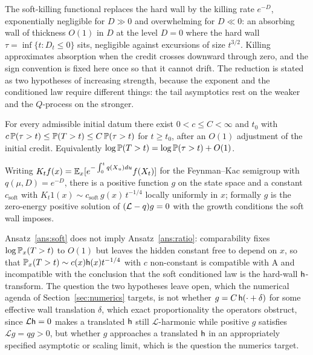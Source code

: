 The soft-killing functional replaces the hard wall by the killing rate
$e^{-D}$, exponentially negligible for $D\gg0$ and overwhelming for
$D\ll0$: an absorbing wall of thickness $O(1)$ in $D$ at the level
$D=0$ where the hard wall $\tau=\inf\{t:D_t\le0\}$ sits, negligible
against excursions of size $t^{3/2}$. Killing approximates absorption
when the credit crosses downward through zero, and the sign convention
is fixed here once so that it cannot drift. The reduction is stated as two hypotheses of increasing strength,
because the exponent and the conditioned law require different
things: the tail asymptotics rest on the weaker and the $Q$-process
on the stronger.

\begin{ansatz}\label{ans:soft}
For every admissible initial datum there exist
$0<c\le C<\infty$ and $t_0$ with
$c\,\mathbb{P}(\tau>t)\le\mathbb{P}(T>t)\le C\,\mathbb{P}(\tau>t)$ for $t\ge t_0$, after an
$O(1)$ adjustment of the initial credit. Equivalently
$\log\mathbb{P}(T>t)=\log\mathbb{P}(\tau>t)+O(1)$.
\end{ansatz}

\begin{ansatz}\label{ans:ratio}
Writing $K_tf(x)=\mathbb{E}_x[e^{-\int_0^tq(X_u)du}f(X_t)]$ for the
Feynman--Kac semigroup with $q(\mu,D)=e^{-D}$, there is a positive
function $g$ on the state space and a constant $c_{\mathrm{soft}}$ with
$K_t1(x)\sim c_{\mathrm{soft}}\,g(x)\,t^{-1/4}$ locally uniformly in
$x$; formally $g$ is the zero-energy positive solution of
$(\mathcal{L}-q)g=0$ with the growth conditions the soft wall imposes.
\end{ansatz}

\noindent Ansatz~\ref{ans:soft} does not imply Ansatz~\ref{ans:ratio}:
comparability fixes $\log\mathbb{P}_x(T>t)$ to $O(1)$ but leaves the hidden
constant free to depend on $x$, so that $\mathbb{P}_x(T>t)\sim c(x)\mathsf{h}(x)t^{-1/4}$
with $c$ non-constant is compatible with A and incompatible with the
conclusion that the soft conditioned law is the hard-wall
$\mathsf{h}$-transform. The question the two hypotheses leave open, which
the numerical agenda of Section~\ref{sec:numerics} targets, is not whether $g = C\,\mathsf{h}(\cdot + \delta)$ for some effective wall translation $\delta$, which exact proportionality the operators obstruct, since $\mathcal{L}\mathsf{h} = 0$ makes a translated $\mathsf{h}$ still $\mathcal{L}$-harmonic while positive $g$ satisfies $\mathcal{L} g = q g > 0$, but whether $g$ approaches a translated $\mathsf{h}$ in an appropriately specified asymptotic or scaling limit, which is the question the numerics target.

